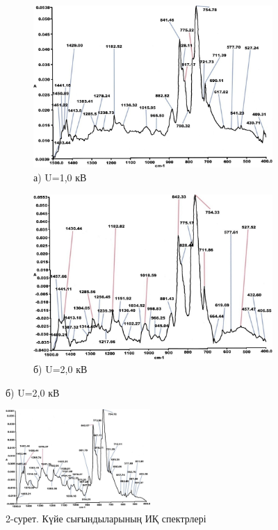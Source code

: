 \begin{figure}[H]
    \centering
    \begin{subfigure}[b]{0.49\textwidth}
        \centering
        \includegraphics[width=\textwidth]{assets/24}
        \caption*{а) U=1,0 кВ}
    \end{subfigure}
    \hfill
    \begin{subfigure}[b]{0.49\textwidth}
        \centering
        \includegraphics[width=\textwidth]{assets/25}
        \caption*{б) U=2,0 кВ}
    \end{subfigure}
\end{figure}

\begin{figure}[H]
    \centering
    \includegraphics[width=0.49\textwidth]{assets/26}
    \caption*{в) U=20,0 кВ}
    \caption*{2-сурет. Күйе сығындыларының ИҚ спектрлері}
\end{figure}

